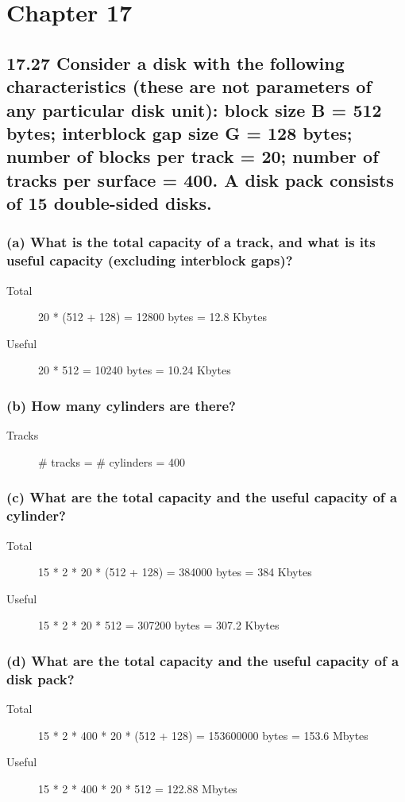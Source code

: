 \section*{Chapter 17}

\subsection*{17.27 Consider a disk with the following characteristics (these are not parameters of any particular disk unit): block size B = 512 bytes; interblock gap size G = 128 bytes; number of blocks per track = 20; number of tracks per surface = 400. A disk pack consists of 15 double-sided disks.}
\subsubsection*{(a) What is the total capacity of a track, and what is its useful capacity (excluding interblock gaps)?}
\begin{description}
\item[Total] 20 * (512 + 128) = 12800 bytes = 12.8 Kbytes
\item[Useful] 20 * 512 = 10240 bytes = 10.24 Kbytes
\end{description}

\subsubsection*{(b) How many cylinders are there?}
\begin{description}
\item[Tracks] $\#$ tracks = $\#$ cylinders = 400
\end{description}

\subsubsection*{(c) What are the total capacity and the useful capacity of a cylinder?}
\begin{description}
\item[Total] 15 * 2 * 20 * (512 + 128) = 384000 bytes = 384 Kbytes
\item[Useful] 15 * 2 * 20 * 512 = 307200 bytes = 307.2 Kbytes
\end{description}

\subsubsection*{(d) What are the total capacity and the useful capacity of a disk pack?}
\begin{description}
\item[Total] 15 * 2 * 400 * 20 * (512 + 128) = 153600000 bytes = 153.6 Mbytes
\item[Useful] 15 * 2 * 400 * 20 * 512 = 122.88 Mbytes
\end{description}

